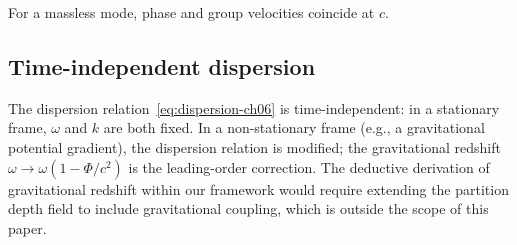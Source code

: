 For a massless mode, phase and group velocities coincide at $c$.

\subsection{Time-independent dispersion}

The dispersion relation~\eqref{eq:dispersion-ch06} is time-independent: in a stationary frame, $\omega$ and $k$ are both fixed. In a non-stationary frame (e.g., a gravitational potential gradient), the dispersion relation is modified; the gravitational redshift $\omega\to\omega(1-\Phi/c^{2})$ is the leading-order correction. The deductive derivation of gravitational redshift within our framework would require extending the partition depth field to include gravitational coupling, which is outside the scope of this paper.

